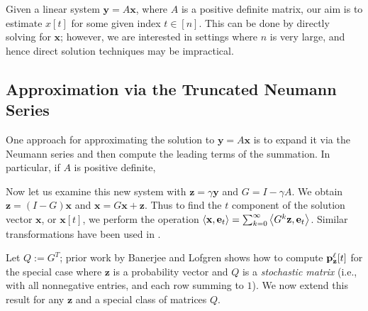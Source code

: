 Given a linear system $\mathbf{y} = A\mathbf{x}$, where $A$ is a positive definite matrix, our aim is to estimate $x[t]$ for some given index $t\in[n]$. 
This can be done by directly solving for $\mathbf{x}$; however, we are interested in settings where $n$ is very large, and hence direct solution techniques may be impractical. 


\subsection{Approximation via the Truncated Neumann Series}

One approach for approximating the solution to $\mathbf{y} = A\mathbf{x}$ is to expand it via the Neumann series and then compute the leading terms of the summation.
In particular, if $A$ is positive definite, 

Now let us examine this new system with $\mathbf{z} = \gamma \mathbf{y}$ and $G = I - \gamma A$. 
We obtain $\mathbf{z} = (I - G)\mathbf{x}$ and $\mathbf{x} = G\mathbf{x} + \mathbf{z}$. 
Thus to find the $t$ component of the solution vector $\mathbf{x}$, or $\mathbf{x}[t]$, we perform the operation $\left< \mathbf{x}, \mathbf{e}_t \right> = \sum_{k=0}^\infty \left< G^k \mathbf{z}, \mathbf{e}_t \right>$. 
Similar transformations have been used in \cite{dimov2015new, lee2014asynchronous, wu2016multi}.

Let $Q:=G^T$; prior work by Banerjee and Lofgren \cite{banerjee2015fast} shows how to compute ${\mathbf{p}}_\mathbf{z}^{\ell}[t]$ for the special case where $\mathbf{z}$ is a probability vector and $Q$ is a \emph{stochastic matrix} (i.e., with all nonnegative entries, and each row summing to $1$). 
We now extend this result for any $\mathbf{z}$ and a special class of matrices $Q$.

